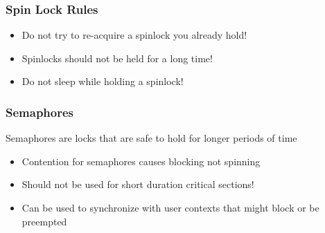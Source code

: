 \begin{frame}[fragile]
    \frametitle{Spin Lock Rules}
    \Large
        \begin{itemize}
        \item Do not try to re-acquire a spinlock you already hold!
        \item Spinlocks should not be held for a long time!
        \item Do not sleep while holding a spinlock!
        
    \end{itemize}

    
\end{frame}


\begin{frame}[fragile]
    \frametitle{Semaphores}
    \Large
    Semaphores are locks that are safe to hold for
    longer periods of time
    \large
    \begin{itemize}
        \item Contention for semaphores causes blocking not spinning
        \item Should not be used for short duration critical sections!
        \item Can be used to synchronize with user contexts that
        might block or be preempted
     \end{itemize}  
\end{frame} 
 

